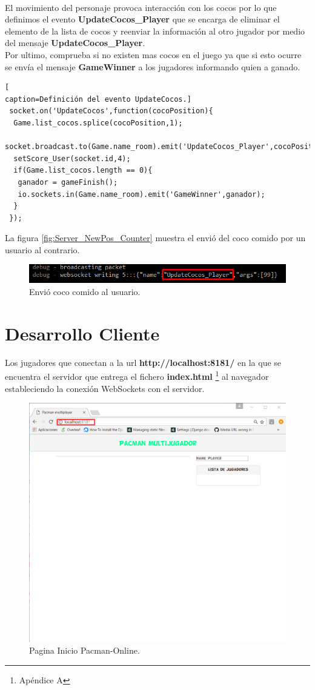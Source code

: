 \\El movimiento del personaje provoca interacción con los cocos por lo que definimos el evento \textbf{UpdateCocos\_Player} que se encarga de eliminar el elemento de la lista de cocos y reenviar la información al otro jugador por medio del mensaje \textbf{UpdateCocos\_Player}.
\\Por ultimo, comprueba si no existen mas cocos en el juego ya que si esto ocurre se envía el mensaje \textbf{GameWinner} a los jugadores informando quien a ganado.
\begin{lstlisting}[
caption=Definición del evento UpdateCocos.]
 socket.on('UpdateCocos',function(cocoPosition){
  Game.list_cocos.splice(cocoPosition,1);
  socket.broadcast.to(Game.name_room).emit('UpdateCocos_Player',cocoPosition);
  setScore_User(socket.id,4);
  if(Game.list_cocos.length == 0){
   ganador = gameFinish();
   io.sockets.in(Game.name_room).emit('GameWinner',ganador);
  }
 });
\end{lstlisting}
La figura \ref{fig:Server_NewPos_Counter} muestra el envió del coco comido por un usuario al contrario.
\begin{figure}[!h]
\begin{center}
   \includegraphics[width=0.9\linewidth]{Figures/Server_UpdateCoco}
	\decoRule
	\caption[Envió coco comido al usuario.]{Envió coco comido al usuario.}
\label{fig:Update_ElementsPosition}
\end{center}
\end{figure}
\section{Desarrollo Cliente}
Los jugadores que conectan a la url \textbf{http://localhost:8181/} en la que se encuentra el servidor que entrega el fichero \textbf{index.html} \footnote{Apéndice A} al navegador estableciendo la conexión WebSockets con el servidor.
\begin{figure}[!h]
\begin{center}
   \includegraphics[width=0.4\linewidth]{Figures/Init_Client}
	\decoRule
	\caption[Pagina Inicio Pacman-Online]{Pagina Inicio Pacman-Online.}
\label{fig:Init_Client}
\end{center}
\end{figure}

